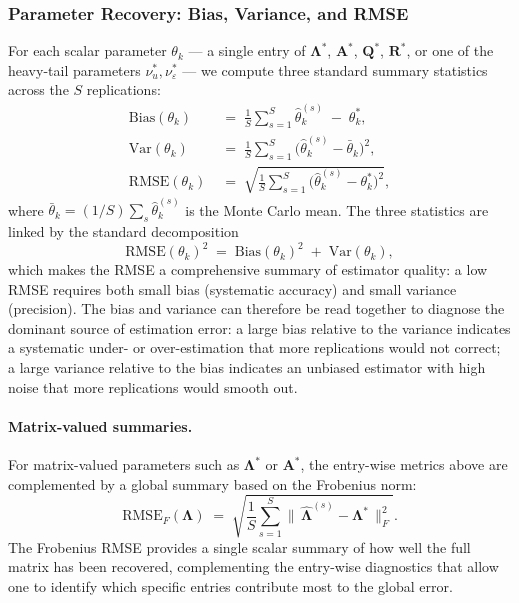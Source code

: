 \documentclass[11pt, a4paper, oneside]{article}
\begin{document}
\subsubsection*{Parameter Recovery: Bias, Variance, and RMSE}

For each scalar parameter $\theta_k$ — a single entry of
$\boldsymbol{\Lambda}^*$, $\mathbf{A}^*$, $\mathbf{Q}^*$,
$\mathbf{R}^*$, or one of the heavy-tail parameters
$\nu_u^*, \nu_\varepsilon^*$ — we compute three standard summary
statistics across the $S$ replications:
\begin{align}
\mathrm{Bias}(\theta_k) \;&=\; \frac{1}{S}\sum_{s=1}^{S} \hat{\theta}_k^{(s)} \;-\; \theta_k^*, \\[3pt]
\mathrm{Var}(\theta_k) \;&=\; \frac{1}{S}\sum_{s=1}^{S} \big(\hat{\theta}_k^{(s)} - \bar{\theta}_k\big)^2, \\[3pt]
\mathrm{RMSE}(\theta_k) \;&=\; \sqrt{\frac{1}{S}\sum_{s=1}^{S} \big(\hat{\theta}_k^{(s)} - \theta_k^*\big)^2},
\end{align}
where $\bar{\theta}_k = (1/S)\sum_s \hat{\theta}_k^{(s)}$ is the
Monte Carlo mean. The three statistics are linked by the standard
decomposition
\[
\mathrm{RMSE}(\theta_k)^2 \;=\; \mathrm{Bias}(\theta_k)^2 \;+\; \mathrm{Var}(\theta_k),
\]
which makes the RMSE a comprehensive summary of estimator quality:
a low RMSE requires both small bias (systematic accuracy) and small
variance (precision). The bias and variance can therefore be read
together to diagnose the dominant source of estimation error: a
large bias relative to the variance indicates a systematic
under- or over-estimation that more replications would not correct;
a large variance relative to the bias indicates an unbiased
estimator with high noise that more replications would smooth out.

\paragraph{Matrix-valued summaries.}
For matrix-valued parameters such as $\boldsymbol{\Lambda}^*$ or
$\mathbf{A}^*$, the entry-wise metrics above are complemented by a
global summary based on the Frobenius norm:
\[
\mathrm{RMSE}_F(\boldsymbol{\Lambda}) \;=\; \sqrt{\frac{1}{S}\sum_{s=1}^{S} \big\|\,\hat{\boldsymbol{\Lambda}}^{(s)} - \boldsymbol{\Lambda}^*\,\big\|_F^2}.
\]
The Frobenius RMSE provides a single scalar summary of how well
the full matrix has been recovered, complementing the entry-wise
diagnostics that allow one to identify which specific entries
contribute most to the global error.
\end{document}
